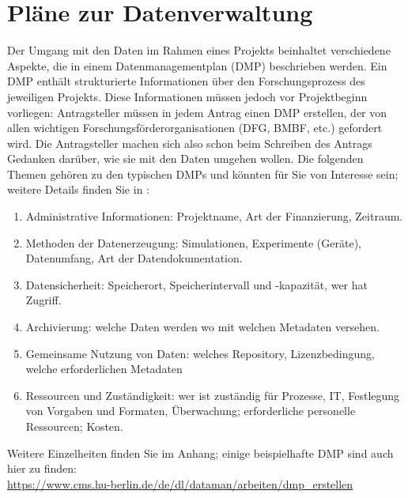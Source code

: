 \section{Pläne zur Datenverwaltung}

Der Umgang mit den Daten im Rahmen eines Projekts beinhaltet verschiedene
Aspekte, die in einem Datenmanagementplan (DMP) beschrieben werden. Ein DMP
enthält strukturierte Informationen über den Forschungsprozess des jeweiligen
Projekts. Diese Informationen müssen jedoch vor Projektbeginn vorliegen:
Antragsteller müssen in jedem Antrag einen DMP erstellen, der von allen
wichtigen Forschungsförderorganisationen (DFG, BMBF, etc.) gefordert wird.
Die Antragsteller machen sich also schon beim Schreiben des Antrags Gedanken
darüber, wie sie mit den Daten umgehen wollen. Die folgenden Themen gehören zu
den typischen DMPs und könnten für Sie von Interesse sein; weitere Details
finden Sie in \cite{dfg2021,hannover2020}:
\begin{enumerate}
  \item Administrative Informationen: Projektname, Art der Finanzierung, Zeitraum.
  \item Methoden der Datenerzeugung: Simulationen, Experimente (Geräte),
        Datenumfang, Art der Datendokumentation.
  \item Datensicherheit: Speicherort, Speicherintervall und -kapazität,
        wer hat Zugriff.
  \item Archivierung: welche Daten werden wo mit welchen Metadaten versehen.
  \item Gemeinsame Nutzung von Daten: welches Repository, Lizenzbedingung,
        welche erforderlichen Metadaten
  \item Ressourcen und Zuständigkeit: wer ist zuständig für Prozesse, IT,
        Festlegung von Vorgaben und Formaten, Überwachung; erforderliche
        personelle Ressourcen; Kosten.
\end{enumerate}
Weitere Einzelheiten finden Sie im Anhang; einige beispielhafte DMP sind auch hier
zu finden: \\
\url{https://www.cms.hu-berlin.de/de/dl/dataman/arbeiten/dmp_erstellen}
